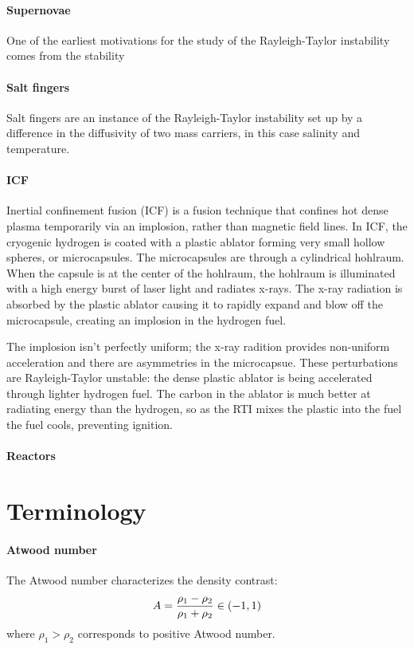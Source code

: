 \paragraph{Supernovae}
One of the earliest motivations for the study of the Rayleigh-Taylor instability comes from the stability 

\paragraph{Salt fingers}
Salt fingers are an instance of the Rayleigh-Taylor instability set up by a difference in the diffusivity of two mass carriers, in this case salinity and temperature.

\paragraph{ICF}
Inertial confinement fusion (ICF) is a fusion technique that confines hot dense plasma temporarily via an implosion, rather than magnetic field lines.
In ICF, the cryogenic hydrogen is coated with a plastic ablator forming very small hollow spheres, or microcapsules.
The microcapsules are through a cylindrical hohlraum.
When the capsule is at the center of the hohlraum, the hohlraum is illuminated with a high energy burst of laser light and radiates x-rays.
The x-ray radiation is absorbed by the plastic ablator causing it to rapidly expand and blow off the microcapsule, creating an implosion in the hydrogen fuel.

The implosion isn't perfectly uniform; the x-ray radition provides non-uniform acceleration and there are asymmetries in the microcapsue.
These perturbations are Rayleigh-Taylor unstable: the dense plastic ablator is being accelerated through lighter hydrogen fuel.
The carbon in the ablator is much better at radiating energy than the hydrogen, so as the RTI mixes the plastic into the fuel the fuel cools, preventing ignition.

\paragraph{Reactors}


\section{Terminology}

\paragraph{Atwood number}
The Atwood number characterizes the density contrast:
\begin{equation} \elabel{atwood}
A = \frac{\rho_1 - \rho_2}{\rho_1 + \rho_2} \in (-1,1)
\end{equation}
where $\rho_1 > \rho_2$ corresponds to positive Atwood number.


